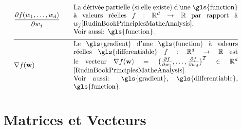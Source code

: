 \newpage
\begin{align}
	&  \frac{\partial f(\weight_{1},\ldots,\weight_{\nrfeatures})}{\partial \weight_{\featureidx}} & \quad & \parbox{.70\textwidth}{La dérivée partielle (si elle existe)
		d'une \gls{function} à valeurs réelles $f: \mathbb{R}^{\featuredim}\rightarrow \mathbb{R}$ par rapport à\ $\weight_{\featureidx}$\cite[Ch. 9]{RudinBookPrinciplesMatheAnalysis}.
		\\ Voir aussi: \gls{function}.} \nonumber \\[2mm] \hline \nonumber\\[-5mm]
	&\nabla f(\weights) & \quad & \parbox{.70\textwidth}{Le \gls{gradient} d'une \gls{function} à valeurs réelles \gls{differentiable} 
		$f: \mathbb{R}^{\featuredim}\rightarrow \mathbb{R}$ est le vecteur
		$\nabla f(\weights) = \big( \frac{\partial f}{\partial \weight_{1}},\ldots,\frac{\partial f}{\partial \weight_{\featuredim}}  \big)^{T} \in \mathbb{R}^{\featuredim}$ \cite[Ch. 9]{RudinBookPrinciplesMatheAnalysis}.
		\\ Voir aussi: \gls{gradient}, \gls{differentiable}, \gls{function}.} \nonumber
\end{align} 


\section*{Matrices et Vecteurs} 

